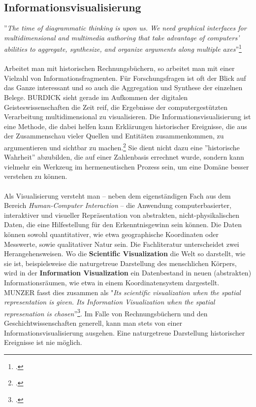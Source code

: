 \documentclass[12pt,a4paper]{article}
\begin{document}
\newpage
\subsection{Informationsvisualisierung}

''\textit{The time of diagrammatic thinking is upon us. We need graphical interfaces for multidimensional and multimedia authoring that take advantage of computers’ abilities to aggregate, synthesize, and organize arguments along multiple axes}''\footcite[][S.119]{burdick2012digital_humanities}
\\
\\
Arbeitet man mit historischen Rechnungsbüchern, so arbeitet man mit einer Vielzahl von Informationsfragmenten. Für Forschungsfragen ist oft der Blick auf das Ganze interessant und so auch die Aggregation und Synthese der einzelnen Belege. BURDICK sieht gerade im Aufkommen der digitalen Geisteswissenschaften die Zeit reif, die Ergebnisse der computergestützten Verarbeitung multidimensional zu visualisieren. Die Informationsvisualisierung ist eine Methode, die dabei helfen kann Erklärungen historischer Ereignisse, die aus der Zusammenschau vieler Quellen und Entitäten zusammenkommen, zu argumentieren und sichtbar zu machen.\footcite[][S.3-5]{frank2018visualisierungswerkzeuge} Sie dient nicht dazu eine ''historische Wahrheit'' abzubilden, die auf einer Zahlenbasis errechnet wurde, sondern kann vielmehr ein Werkzeug im hermeneutischen Prozess sein, um eine Domäne besser verstehen zu können.
\\
\\
Als Visualisierung versteht man -- neben dem eigenständigen Fach aus dem Bereich \textit{Human-Computer Interaction} -- die Anwendung computerbasierter, interaktiver und visueller Repräsentation von abstrakten, nicht-physikalischen Daten, die eine Hilfestellung für den Erkenntnisgewinn sein können. Die Daten können sowohl quantitativer, wie etwa geographische Koordinaten oder Messwerte, sowie qualitativer Natur sein. Die Fachliteratur unterscheidet zwei Herangehensweisen. Wo die \textbf{Scientific Visualization} die Welt so darstellt, wie sie ist, beispielsweise die naturgetreue Darstellung des menschlichen Körpers, wird in der \textbf{Information Visualization} ein Datenbestand in neuen (abstrakten) Informationsräumen, wie etwa in einem Koordinatensystem dargestellt. MUNZER fasst dies zusammen als "\textit{Its scientific visualization when the spatial representation is given. Its Information Visualization when the spatial represenation is chosen}''\footcite[][S.134-153)]{munzner2008process}. Im Falle von Rechnungsbüchern und den Geschichtwissenschaften generell, kann man stets von einer Informationsvisualisierung ausgehen. Eine naturgetreue Darstellung historischer Ereignisse ist nie möglich.
\end{document}
